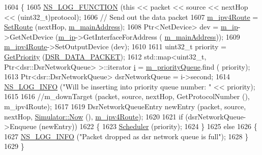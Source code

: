 \begin{DoxyCode}
1604 \{
1605   \hyperlink{log-macros-disabled_8h_a90b90d5bad1f39cb1b64923ea94c0761}{NS\_LOG\_FUNCTION} (\textcolor{keyword}{this} << packet << source << nextHop << (uint32\_t)protocol);
1606   \textcolor{comment}{// Send out the data packet}
1607   \hyperlink{classns3_1_1dsr_1_1DsrRouting_ab4c16d56044159989e52ad33c0afed2b}{m\_ipv4Route} = \hyperlink{classns3_1_1dsr_1_1DsrRouting_a8a726fb52558a1a8172a5bd5b8cdb072}{SetRoute} (nextHop, \hyperlink{classns3_1_1dsr_1_1DsrRouting_a73182b5edee2d8460f28855e058fc9a0}{m\_mainAddress});
1608   Ptr<NetDevice> dev = \hyperlink{classns3_1_1dsr_1_1DsrRouting_a0443d48172143cafa1d0491e35f3fbaf}{m\_ip}->GetNetDevice (\hyperlink{classns3_1_1dsr_1_1DsrRouting_a0443d48172143cafa1d0491e35f3fbaf}{m\_ip}->GetInterfaceForAddress (
      \hyperlink{classns3_1_1dsr_1_1DsrRouting_a73182b5edee2d8460f28855e058fc9a0}{m\_mainAddress}));
1609   \hyperlink{classns3_1_1dsr_1_1DsrRouting_ab4c16d56044159989e52ad33c0afed2b}{m\_ipv4Route}->SetOutputDevice (dev);
1610 
1611   uint32\_t priority = \hyperlink{classns3_1_1dsr_1_1DsrRouting_a67d111b0188b6e2210d1b4782820f8e3}{GetPriority} (\hyperlink{namespacens3_1_1dsr_a7c80bcec67d78dc149a0e503014d07c5ad29c69f5a6ad5fbb5eec5524f553e315}{DSR\_DATA\_PACKET});
1612   std::map<uint32\_t, Ptr<dsr::DsrNetworkQueue> >::iterator \hyperlink{bernuolliDistribution_8m_a6f6ccfcf58b31cb6412107d9d5281426}{i} = \hyperlink{classns3_1_1dsr_1_1DsrRouting_a4606c3dfb1099afbfe1e7cd1d1c3c8ee}{m\_priorityQueue}.find (
      priority);
1613   Ptr<dsr::DsrNetworkQueue> dsrNetworkQueue = i->second;
1614   \hyperlink{group__logging_gafbd73ee2cf9f26b319f49086d8e860fb}{NS\_LOG\_INFO} (\textcolor{stringliteral}{"Will be inserting into priority queue number: "} << priority);
1615 
1616   \textcolor{comment}{//m\_downTarget (packet, source, nextHop, GetProtocolNumber (), m\_ipv4Route);}
1617 
1619  DsrNetworkQueueEntry newEntry (packet, source, nextHop, \hyperlink{classns3_1_1Simulator_ac3178fa975b419f7875e7105be122800}{Simulator::Now} (), 
      \hyperlink{classns3_1_1dsr_1_1DsrRouting_ab4c16d56044159989e52ad33c0afed2b}{m\_ipv4Route});
1620 
1621  \textcolor{keywordflow}{if} (dsrNetworkQueue->Enqueue (newEntry))
1622    \{
1623      \hyperlink{classns3_1_1dsr_1_1DsrRouting_aa518edb174bccce1062304404424c6e0}{Scheduler} (priority);
1624    \}
1625  \textcolor{keywordflow}{else}
1626    \{
1627      \hyperlink{group__logging_gafbd73ee2cf9f26b319f49086d8e860fb}{NS\_LOG\_INFO} (\textcolor{stringliteral}{"Packet dropped as dsr network queue is full"});
1628    \}
1629 \}
\end{DoxyCode}


